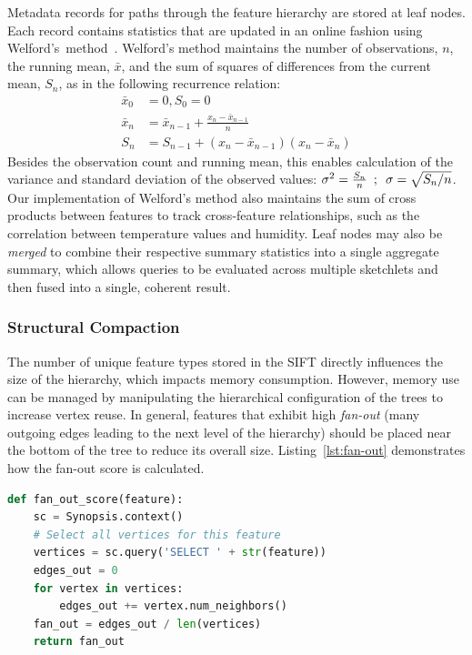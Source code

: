 \documentclass[9pt,journal,compsoc]{IEEEtran}
\begin{document}
Metadata records for paths through the feature hierarchy are stored at leaf nodes. Each record contains statistics that are updated in an online fashion using Welford's~method~\cite{welford1962note}. Welford's method maintains the number of observations, $n$, the running mean, $\bar{x}$, and the sum of squares of differences from the current mean, $S_n$, as in the following recurrence relation:
\begin{align*}
    \bar{x}_0 &= 0, S_0 = 0 \\
    \bar{x}_n &= \bar{x}_{n - 1} + \frac{x_n - \bar{x}_{n - 1}}{n} \\
    S_n       &= S_{n - 1} + (x_n - \bar{x}_{n - 1})(x_n - \bar{x}_n)
\end{align*}
Besides the observation count and running mean, this enables calculation of the variance and standard deviation of the observed values: $\sigma^2 = \frac{S_n}{n} \hspace{0.5em};\hspace{0.5em} \sigma = \sqrt{{S_n}/{n}}$. Our implementation of Welford's method also maintains the sum of cross products between features to track cross-feature relationships, such as the correlation between temperature values and humidity. Leaf nodes may also be \emph{merged} to combine their respective summary statistics into a single aggregate summary, which allows queries to be evaluated across multiple sketchlets and then fused into a single, coherent result.

\subsubsection{Structural Compaction}
The number of unique feature types stored in the SIFT directly influences the size of the hierarchy, which impacts memory consumption. However, memory use can be managed by manipulating the hierarchical configuration of the trees to increase vertex reuse.  In general, features that exhibit high \emph{fan-out} (many outgoing edges leading to the next level of the hierarchy) should be placed near the bottom of the tree to reduce its overall size. Listing~\ref{lst:fan-out} demonstrates how the fan-out score is calculated.

\begin{lstlisting}[language=Python,style=custompy,emph={fan_out_score,compact_hierarchy},caption={Calculation of the fan-out score (average number of outgoing edges) for dynamic reconfiguration.},label={lst:fan-out}]
def fan_out_score(feature):
    sc = Synopsis.context()
    # Select all vertices for this feature
    vertices = sc.query('SELECT ' + str(feature))
    edges_out = 0
    for vertex in vertices:
        edges_out += vertex.num_neighbors()
    fan_out = edges_out / len(vertices)
    return fan_out
\end{lstlisting}
\end{document}

